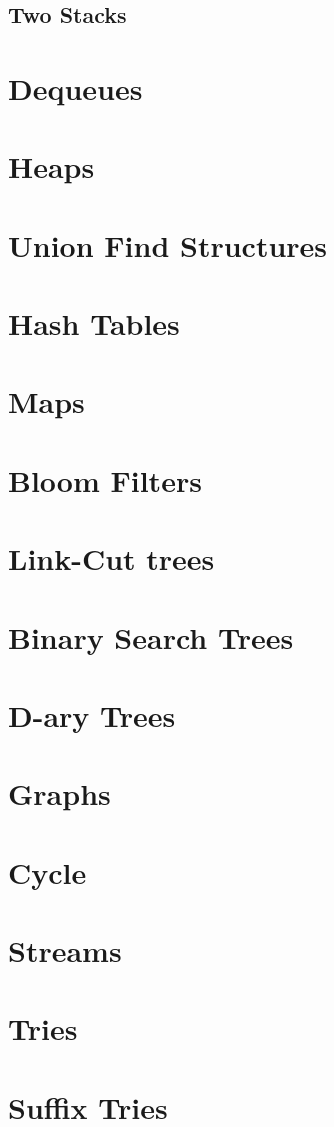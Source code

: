 \documentclass[12pt, letterpaper]{book}
\begin{document}
	\subsection{Two Stacks}

\section{Dequeues}
\section{Heaps}
\section{Union Find Structures}
\section{Hash Tables}
\section{Maps}
\section{Bloom Filters}
\section{Link-Cut trees}
\section{Binary Search Trees}
\section{D-ary Trees}
\section{Graphs}
\section{Cycle}
\section{Streams} \label{streams}
\section{Tries}
\section{Suffix Tries}
\end{document}
